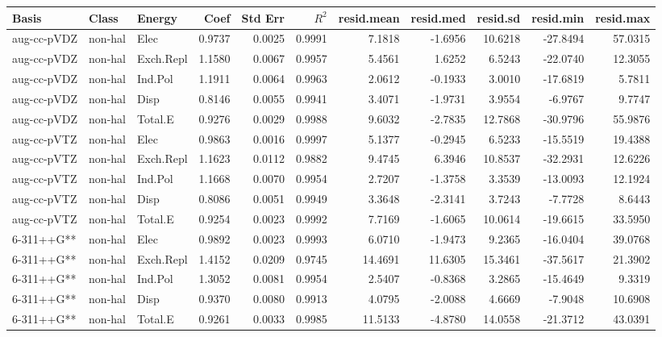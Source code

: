 \begin{table}[ht]
\centering
\scriptsize
\begin{tabular}{lllrrrrrrrr}
  \hline
Basis & Class & Energy & Coef & Std Err & $R^2$ & resid.mean & resid.med & resid.sd & resid.min & resid.max \\ 
  \hline
aug-cc-pVDZ & non-hal & Elec & 0.9737 & 0.0025 & 0.9991 & 7.1818 & -1.6956 & 10.6218 & -27.8494 & 57.0315 \\ 
  aug-cc-pVDZ & non-hal & Exch.Repl & 1.1580 & 0.0067 & 0.9957 & 5.4561 & 1.6252 & 6.5243 & -22.0740 & 12.3055 \\ 
  aug-cc-pVDZ & non-hal & Ind.Pol & 1.1911 & 0.0064 & 0.9963 & 2.0612 & -0.1933 & 3.0010 & -17.6819 & 5.7811 \\ 
  aug-cc-pVDZ & non-hal & Disp & 0.8146 & 0.0055 & 0.9941 & 3.4071 & -1.9731 & 3.9554 & -6.9767 & 9.7747 \\ 
  aug-cc-pVDZ & non-hal & Total.E & 0.9276 & 0.0029 & 0.9988 & 9.6032 & -2.7835 & 12.7868 & -30.9796 & 55.9876 \\ 
  aug-cc-pVTZ & non-hal & Elec & 0.9863 & 0.0016 & 0.9997 & 5.1377 & -0.2945 & 6.5233 & -15.5519 & 19.4388 \\ 
  aug-cc-pVTZ & non-hal & Exch.Repl & 1.1623 & 0.0112 & 0.9882 & 9.4745 & 6.3946 & 10.8537 & -32.2931 & 12.6226 \\ 
  aug-cc-pVTZ & non-hal & Ind.Pol & 1.1668 & 0.0070 & 0.9954 & 2.7207 & -1.3758 & 3.3539 & -13.0093 & 12.1924 \\ 
  aug-cc-pVTZ & non-hal & Disp & 0.8086 & 0.0051 & 0.9949 & 3.3648 & -2.3141 & 3.7243 & -7.7728 & 8.6443 \\ 
  aug-cc-pVTZ & non-hal & Total.E & 0.9254 & 0.0023 & 0.9992 & 7.7169 & -1.6065 & 10.0614 & -19.6615 & 33.5950 \\ 
  6-311++G** & non-hal & Elec & 0.9892 & 0.0023 & 0.9993 & 6.0710 & -1.9473 & 9.2365 & -16.0404 & 39.0768 \\ 
  6-311++G** & non-hal & Exch.Repl & 1.4152 & 0.0209 & 0.9745 & 14.4691 & 11.6305 & 15.3461 & -37.5617 & 21.3902 \\ 
  6-311++G** & non-hal & Ind.Pol & 1.3052 & 0.0081 & 0.9954 & 2.5407 & -0.8368 & 3.2865 & -15.4649 & 9.3319 \\ 
  6-311++G** & non-hal & Disp & 0.9370 & 0.0080 & 0.9913 & 4.0795 & -2.0088 & 4.6669 & -7.9048 & 10.6908 \\ 
  6-311++G** & non-hal & Total.E & 0.9261 & 0.0033 & 0.9985 & 11.5133 & -4.8780 & 14.0558 & -21.3712 & 43.0391 \\ 

\end{tabular}
\end{table}
